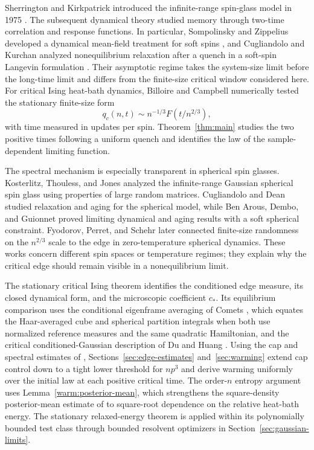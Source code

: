 Sherrington and Kirkpatrick introduced the infinite-range spin-glass
model in 1975 \cite{SK1975}. The subsequent dynamical theory studied
memory through two-time correlation and response functions. In particular,
Sompolinsky and Zippelius developed a dynamical mean-field treatment
for soft spins \cite{SompolinskyZippelius1982}, and Cugliandolo and
Kurchan analyzed nonequilibrium relaxation after a quench in a
soft-spin Langevin formulation \cite{CugliandoloKurchan1994}. Their
asymptotic regime takes the system-size limit before the long-time limit
and differs from the finite-size critical window considered here.
For critical Ising heat-bath dynamics, Billoire and Campbell
\cite[Equation~(7)]{BilloireCampbell2011} numerically tested the
stationary finite-size form
\[
 q_c(n,t)\sim n^{-1/3}F(t/n^{2/3}),
\]
with time measured in updates per spin. Theorem~\ref{thm:main} studies
the two positive times following a uniform quench and identifies the
law of the sample-dependent limiting function.

The spectral mechanism is especially transparent in spherical spin
glasses. Kosterlitz, Thouless, and Jones
\cite{KosterlitzThoulessJones1976} analyzed the infinite-range Gaussian
spherical spin glass using properties of large random matrices.
Cugliandolo and Dean \cite{CugliandoloDean1995}
studied relaxation and aging for the spherical model, while
Ben Arous, Dembo, and Guionnet \cite{BenArousDemboGuionnet2001}
proved limiting dynamical and aging results with a soft spherical
constraint. Fyodorov, Perret, and Schehr
\cite{FyodorovPerretSchehr2015} later connected finite-size randomness
on the \(n^{2/3}\) scale to the edge in zero-temperature spherical
dynamics. These works concern different spin spaces or temperature
regimes; they explain why the critical edge should remain visible in
a nonequilibrium limit.

The stationary critical Ising theorem \cite{FUA} identifies the
conditioned edge measure, its closed dynamical form, and the
microscopic coefficient \(c_*\). Its equilibrium comparison uses
the conditional eigenframe averaging of Comets \cite[Equations~(2.1)--(2.2)]{Comets1996},
which equates the Haar-averaged cube and spherical partition integrals
when both use normalized reference measures and the same quadratic
Hamiltonian, and the
critical conditioned-Gaussian description of Du and Huang
\cite{DuHuang2026FreeEnergy,DuHuang2026Overlap}. Using the cap and
spectral estimates of \cite{FUA,CM,CS},
Sections~\ref{sec:edge-estimates} and~\ref{sec:warming} extend cap
control down to a tight lower threshold for \(np^3\) and derive warming
uniformly over the initial law at each positive critical time. The
order-\(n\) entropy argument uses Lemma~\ref{warm:posterior-mean}, which
strengthens the square-density posterior-mean estimate of
\cite[Proposition~7.3]{SG} to square-root dependence on the relative
heat-bath energy. The stationary relaxed-energy theorem is applied within its
polynomially bounded test class through bounded resolvent optimizers in
Section~\ref{sec:gaussian-limits}.

